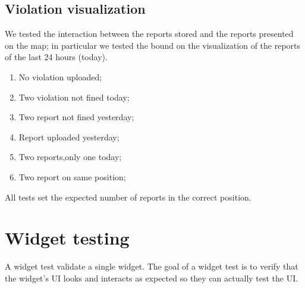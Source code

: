\documentclass[../ITD.tex]{subfiles}
\begin{document}
    \subsection{Violation visualization}\label{subsec:violation-visualization}
    We tested the interaction between the reports stored and the reports presented on the map; in particular we tested the bound on the visualization of the reports of the last 24 hours (today).
    \begin{enumerate}
        \item No violation uploaded;
        \item Two violation not fined today;
        \item Two report not fined yesterday;
        \item Report uploaded yesterday;
        \item Two reports,only one today;
        \item Two report on same position;
    \end{enumerate}
    All tests set the expected number of reports in the correct position.
    \section{Widget testing}\label{sec:widget-testing}
    A widget test validate a single widget.
    The goal of a widget test is to verify that the widget’s UI looks and interacts as expected so they can actually test the UI.
\end{document}
